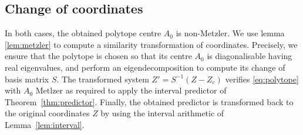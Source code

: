 \documentclass{article}
\begin{document}
\subsection{Change of coordinates}
In both cases, the obtained polytope centre $A_0$ is non-Metzler.
We use lemma \ref{lem:metzler} to compute a similarity transformation of coordinates. Precisely, we ensure that the polytope is chosen so that its centre $A_0$ is diagonalisable having real eigenvalues, and perform an eigendecomposition to compute its change of basis matrix $S$. The transformed system $Z'=S^{-1}(Z-Z_c)$ verifies \eqref{eq:polytope} with $A_0$ Metlzer as required to apply the interval predictor of Theorem~\ref{thm:predictor}. Finally, the obtained predictor is transformed back to the original coordinates $Z$ by using the interval arithmetic of Lemma~\ref{lem:interval}.
\end{document}
